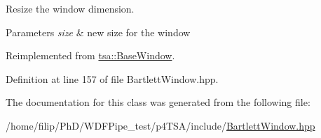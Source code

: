 Resize the window dimension.


\begin{DoxyParams}{Parameters}
{\em size} & new size for the window \\
\hline
\end{DoxyParams}


Reimplemented from \hyperlink{classtsa_1_1_base_window_a8a2a3425f2915762d50fa57dd0e04f22}{tsa\+::\+Base\+Window}.



Definition at line 157 of file Bartlett\+Window.\+hpp.



The documentation for this class was generated from the following file\+:\begin{DoxyCompactItemize}
\item 
/home/filip/\+Ph\+D/\+W\+D\+F\+Pipe\+\_\+test/p4\+T\+S\+A/include/\hyperlink{_bartlett_window_8hpp}{Bartlett\+Window.\+hpp}\end{DoxyCompactItemize}
